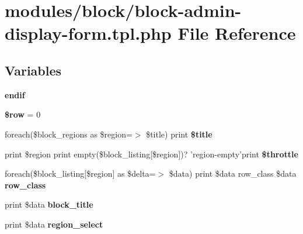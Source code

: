 \hypertarget{block-admin-display-form_8tpl_8php}{
\section{modules/block/block-admin-display-form.tpl.php File Reference}
\label{block-admin-display-form_8tpl_8php}
}
\subsection*{Variables}
\begin{CompactItemize}
\item 
\hypertarget{block-admin-display-form_8tpl_8php_83f8c6b3a45c84dd22ae447bc1db4a02}{
\textbf{endif}}
\label{block-admin-display-form_8tpl_8php_83f8c6b3a45c84dd22ae447bc1db4a02}

\item 
\hypertarget{block-admin-display-form_8tpl_8php_a1d731aa570613e5bcff831bb10e9b87}{
\textbf{\$row} = 0}
\label{block-admin-display-form_8tpl_8php_a1d731aa570613e5bcff831bb10e9b87}

\item 
\hypertarget{block-admin-display-form_8tpl_8php_f8411aa82d563d45a6b9fdff2acd0b2a}{
foreach(\$block\_\-regions as \$region=$>$ \$title) print \textbf{\$title}}
\label{block-admin-display-form_8tpl_8php_f8411aa82d563d45a6b9fdff2acd0b2a}

\item 
\hypertarget{block-admin-display-form_8tpl_8php_ec492a7b7b58c16cf244f957247309af}{
print \$region print empty(\$block\_\-listing\mbox{[}\$region\mbox{]})? 'region-empty'print \textbf{\$throttle}}
\label{block-admin-display-form_8tpl_8php_ec492a7b7b58c16cf244f957247309af}

\item 
\hypertarget{block-admin-display-form_8tpl_8php_67d2c28c51080109034a41a89093b8a5}{
foreach(\$block\_\-listing\mbox{[}\$region\mbox{]} as \$delta=$>$ \$data) print \$data row\_\-class \$data \textbf{row\_\-class}}
\label{block-admin-display-form_8tpl_8php_67d2c28c51080109034a41a89093b8a5}

\item 
\hypertarget{block-admin-display-form_8tpl_8php_e6f124c3cfec71296c1effa62aa1f702}{
print \$data \textbf{block\_\-title}}
\label{block-admin-display-form_8tpl_8php_e6f124c3cfec71296c1effa62aa1f702}

\item 
\hypertarget{block-admin-display-form_8tpl_8php_4b2728655aa79683aba2c2a202a7aca8}{
print \$data \textbf{region\_\-select}}
\label{block-admin-display-form_8tpl_8php_4b2728655aa79683aba2c2a202a7aca8}


\end{CompactItemize}
